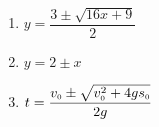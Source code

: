 \begin{multicols}{3}
\begin{enumerate}
\setcounter{enumi}{\value{HW}}


\item $y = \dfrac{3 \pm \sqrt{16x + 9}}{2}$ 
\item $y = 2 \pm x$ 
\item $t = \dfrac{v_{\mbox{\tiny $0$}} \pm \sqrt{v_{\mbox{\tiny $0$}}^{2} + 4gs_{\mbox{\tiny $0$}}}}{2g}  $

\setcounter{HW}{\value{enumi}}
\end{enumerate}
\end{multicols}

\closegraphsfile